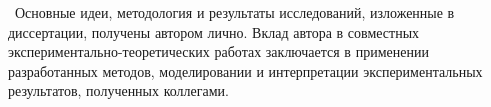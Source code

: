 

\contribution\ Основные идеи, методология и результаты исследований, изложенные в диссертации, получены автором лично.
Вклад автора в совместных экспериментально-теоретических работах заключается в применении разработанных методов, моделировании и интерпретации экспериментальных результатов, полученных коллегами.




